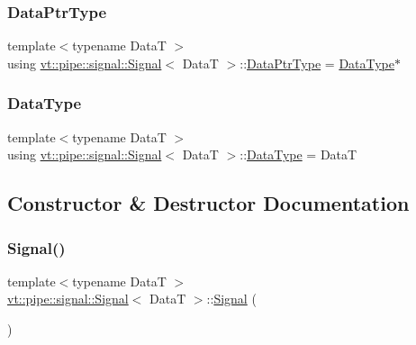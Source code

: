 \subsubsection{\texorpdfstring{Data\+Ptr\+Type}{DataPtrType}}
{\footnotesize\ttfamily template$<$typename DataT $>$ \\
using \hyperlink{structvt_1_1pipe_1_1signal_1_1_signal}{vt\+::pipe\+::signal\+::\+Signal}$<$ DataT $>$\+::\hyperlink{structvt_1_1pipe_1_1signal_1_1_signal_a9c8166338314e5d595575c21eaa42859}{Data\+Ptr\+Type} =  \hyperlink{structvt_1_1pipe_1_1signal_1_1_signal_af5f782c77d6c762dc35fc097cce53732}{Data\+Type}$\ast$}

\mbox{\label{structvt_1_1pipe_1_1signal_1_1_signal_af5f782c77d6c762dc35fc097cce53732}} 
\subsubsection{\texorpdfstring{Data\+Type}{DataType}}
{\footnotesize\ttfamily template$<$typename DataT $>$ \\
using \hyperlink{structvt_1_1pipe_1_1signal_1_1_signal}{vt\+::pipe\+::signal\+::\+Signal}$<$ DataT $>$\+::\hyperlink{structvt_1_1pipe_1_1signal_1_1_signal_af5f782c77d6c762dc35fc097cce53732}{Data\+Type} =  DataT}



\subsection{Constructor \& Destructor Documentation}
\mbox{\label{structvt_1_1pipe_1_1signal_1_1_signal_a019363b72392fcf448dc72194f66166f}} 
\subsubsection{\texorpdfstring{Signal()}{Signal()}\hspace{0.1cm}{\footnotesize\ttfamily [1/5]}}
{\footnotesize\ttfamily template$<$typename DataT $>$ \\
\hyperlink{structvt_1_1pipe_1_1signal_1_1_signal}{vt\+::pipe\+::signal\+::\+Signal}$<$ DataT $>$\+::\hyperlink{structvt_1_1pipe_1_1signal_1_1_signal}{Signal} (\begin{DoxyParamCaption}{ }\end{DoxyParamCaption})\hspace{0.3cm}{\ttfamily [default]}}

